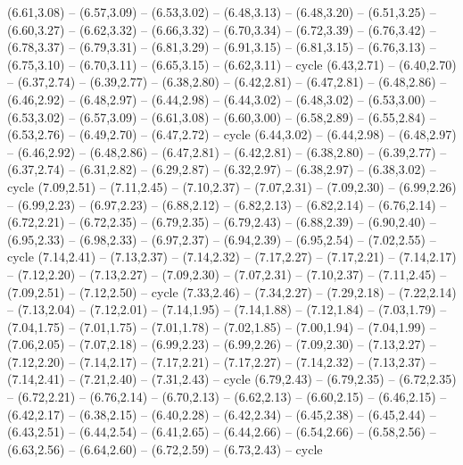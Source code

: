 \expandafter\def\csname geo:gebiet:CAF\endcsname{
  (6.61,3.08) -- (6.57,3.09) -- (6.53,3.02) -- (6.48,3.13) -- (6.48,3.20) -- (6.51,3.25) -- (6.60,3.27) -- (6.62,3.32) -- (6.66,3.32) -- (6.70,3.34) -- (6.72,3.39) -- (6.76,3.42) -- (6.78,3.37) -- (6.79,3.31) -- (6.81,3.29) -- (6.91,3.15) -- (6.81,3.15) -- (6.76,3.13) -- (6.75,3.10) -- (6.70,3.11) -- (6.65,3.15) -- (6.62,3.11) -- cycle}
\expandafter\def\csname geo:gebiet:COG\endcsname{
  (6.43,2.71) -- (6.40,2.70) -- (6.37,2.74) -- (6.39,2.77) -- (6.38,2.80) -- (6.42,2.81) -- (6.47,2.81) -- (6.48,2.86) -- (6.46,2.92) -- (6.48,2.97) -- (6.44,2.98) -- (6.44,3.02) -- (6.48,3.02) -- (6.53,3.00) -- (6.53,3.02) -- (6.57,3.09) -- (6.61,3.08) -- (6.60,3.00) -- (6.58,2.89) -- (6.55,2.84) -- (6.53,2.76) -- (6.49,2.70) -- (6.47,2.72) -- cycle}
\expandafter\def\csname geo:gebiet:GAB\endcsname{
  (6.44,3.02) -- (6.44,2.98) -- (6.48,2.97) -- (6.46,2.92) -- (6.48,2.86) -- (6.47,2.81) -- (6.42,2.81) -- (6.38,2.80) -- (6.39,2.77) -- (6.37,2.74) -- (6.31,2.82) -- (6.29,2.87) -- (6.32,2.97) -- (6.38,2.97) -- (6.38,3.02) -- cycle}
\expandafter\def\csname geo:gebiet:GNQ\endcsname{
  }
\expandafter\def\csname geo:gebiet:ZMB\endcsname{
  (7.09,2.51) -- (7.11,2.45) -- (7.10,2.37) -- (7.07,2.31) -- (7.09,2.30) -- (6.99,2.26) -- (6.99,2.23) -- (6.97,2.23) -- (6.88,2.12) -- (6.82,2.13) -- (6.82,2.14) -- (6.76,2.14) -- (6.72,2.21) -- (6.72,2.35) -- (6.79,2.35) -- (6.79,2.43) -- (6.88,2.39) -- (6.90,2.40) -- (6.95,2.33) -- (6.98,2.33) -- (6.97,2.37) -- (6.94,2.39) -- (6.95,2.54) -- (7.02,2.55) -- cycle}
\expandafter\def\csname geo:gebiet:MWI\endcsname{
  (7.14,2.41) -- (7.13,2.37) -- (7.14,2.32) -- (7.17,2.27) -- (7.17,2.21) -- (7.14,2.17) -- (7.12,2.20) -- (7.13,2.27) -- (7.09,2.30) -- (7.07,2.31) -- (7.10,2.37) -- (7.11,2.45) -- (7.09,2.51) -- (7.12,2.50) -- cycle}
\expandafter\def\csname geo:gebiet:MOZ\endcsname{
  (7.33,2.46) -- (7.34,2.27) -- (7.29,2.18) -- (7.22,2.14) -- (7.13,2.04) -- (7.12,2.01) -- (7.14,1.95) -- (7.14,1.88) -- (7.12,1.84) -- (7.03,1.79) -- (7.04,1.75) -- (7.01,1.75) -- (7.01,1.78) -- (7.02,1.85) -- (7.00,1.94) -- (7.04,1.99) -- (7.06,2.05) -- (7.07,2.18) -- (6.99,2.23) -- (6.99,2.26) -- (7.09,2.30) -- (7.13,2.27) -- (7.12,2.20) -- (7.14,2.17) -- (7.17,2.21) -- (7.17,2.27) -- (7.14,2.32) -- (7.13,2.37) -- (7.14,2.41) -- (7.21,2.40) -- (7.31,2.43) -- cycle}
\expandafter\def\csname geo:gebiet:SWZ\endcsname{
  }
\expandafter\def\csname geo:gebiet:AGO\endcsname{
  (6.79,2.43) -- (6.79,2.35) -- (6.72,2.35) -- (6.72,2.21) -- (6.76,2.14) -- (6.70,2.13) -- (6.62,2.13) -- (6.60,2.15) -- (6.46,2.15) -- (6.42,2.17) -- (6.38,2.15) -- (6.40,2.28) -- (6.42,2.34) -- (6.45,2.38) -- (6.45,2.44) -- (6.43,2.51) -- (6.44,2.54) -- (6.41,2.65) -- (6.44,2.66) -- (6.54,2.66) -- (6.58,2.56) -- (6.63,2.56) -- (6.64,2.60) -- (6.72,2.59) -- (6.73,2.43) -- cycle}
